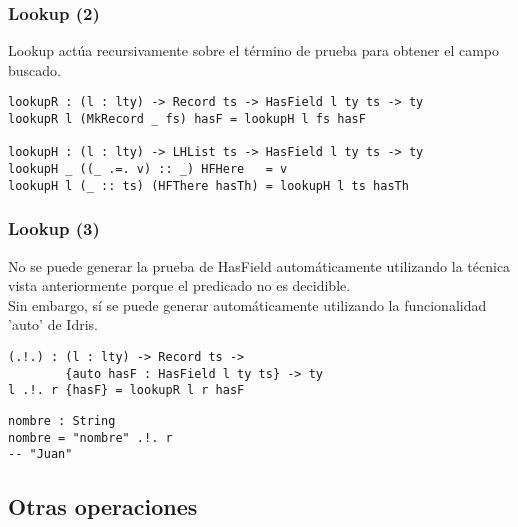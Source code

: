\documentclass{beamer}
\begin{document}
\begin{frame}[fragile]
\frametitle{Lookup (2)}

Lookup actúa recursivamente sobre el término de prueba para obtener el campo buscado.

\begin{example}
\begin{verbatim}
lookupR : (l : lty) -> Record ts -> HasField l ty ts -> ty
lookupR l (MkRecord _ fs) hasF = lookupH l fs hasF

lookupH : (l : lty) -> LHList ts -> HasField l ty ts -> ty
lookupH _ ((_ .=. v) :: _) HFHere   = v
lookupH l (_ :: ts) (HFThere hasTh) = lookupH l ts hasTh
\end{verbatim}
\end{example}

\end{frame}

\begin{frame}[fragile]
\frametitle{Lookup (3)}

No se puede generar la prueba de HasField automáticamente utilizando la técnica vista anteriormente porque el predicado no es decidible. \\

Sin embargo, sí se puede generar automáticamente utilizando la funcionalidad 'auto' de Idris.

\pause

\begin{example}
\begin{verbatim}
(.!.) : (l : lty) -> Record ts -> 
        {auto hasF : HasField l ty ts} -> ty
l .!. r {hasF} = lookupR l r hasF
\end{verbatim}
\end{example}

\pause

\begin{example}[Ejemplo]
\begin{verbatim}
nombre : String
nombre = "nombre" .!. r
-- "Juan"
\end{verbatim}
\end{example}

\end{frame}

\subsection{Otras operaciones}
\end{document}
